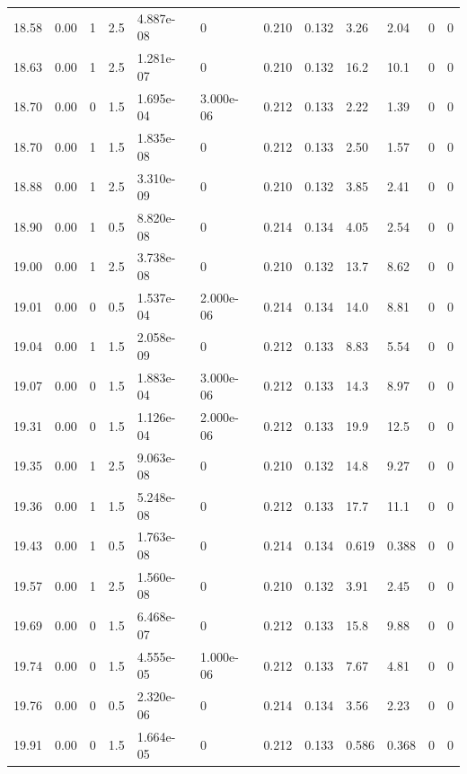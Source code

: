 \documentclass[preview]{standalone}
\begin{document}
{{{{{{{\begin{tabular}{L{1.2cm}C{1.2cm} C{0.3cm}C{0.5cm} C{1.4cm}C{1.4cm} C{1.4cm}C{1.4cm} C{1.6cm}C{1.6cm} C{1.6cm}C{1.6cm}}
  18.58  &  0.00  & 1     & 2.5 &  4.887e-08  & 0  &  0.210&   0.132& 3.26 & 2.04   &  0 & 0  \\ 
  18.63  &  0.00  & 1     & 2.5 &  1.281e-07  & 0  &  0.210&   0.132& 16.2 & 10.1   &  0 & 0  \\ 
  18.70  &  0.00  & 0     & 1.5 &  1.695e-04  & 3.000e-06  &  0.212&   0.133& 2.22 & 1.39   &  0 & 0  \\ 
  18.70  &  0.00  & 1     & 1.5 &  1.835e-08  & 0  &  0.212&   0.133& 2.50 & 1.57   &  0 & 0  \\ 
  18.88  &  0.00  & 1     & 2.5 &  3.310e-09  & 0  &  0.210&   0.132& 3.85 & 2.41   &  0 & 0  \\ 
  18.90  &  0.00  & 1     & 0.5 &  8.820e-08  & 0  &  0.214&   0.134& 4.05 & 2.54   &  0 & 0  \\ 
  19.00  &  0.00  & 1     & 2.5 &  3.738e-08  & 0  &  0.210&   0.132& 13.7 & 8.62   &  0 & 0  \\ 
  19.01  &  0.00  & 0     & 0.5 &  1.537e-04  & 2.000e-06  &  0.214&   0.134& 14.0 & 8.81   &  0 & 0  \\ 
  19.04  &  0.00  & 1     & 1.5 &  2.058e-09  & 0  &  0.212&   0.133& 8.83 & 5.54   &  0 & 0  \\ 
  19.07  &  0.00  & 0     & 1.5 &  1.883e-04  & 3.000e-06  &  0.212&   0.133& 14.3 & 8.97   &  0 & 0  \\ 
  19.31  &  0.00  & 0     & 1.5 &  1.126e-04  & 2.000e-06  &  0.212&   0.133& 19.9 & 12.5   &  0 & 0  \\ 
  19.35  &  0.00  & 1     & 2.5 &  9.063e-08  & 0  &  0.210&   0.132& 14.8 & 9.27   &  0 & 0  \\ 
  19.36  &  0.00  & 1     & 1.5 &  5.248e-08  & 0  &  0.212&   0.133& 17.7 & 11.1   &  0 & 0  \\ 
  19.43  &  0.00  & 1     & 0.5 &  1.763e-08  & 0  &  0.214&   0.134& 0.619 & 0.388   &  0 & 0  \\ 
  19.57  &  0.00  & 1     & 2.5 &  1.560e-08  & 0  &  0.210&   0.132& 3.91 & 2.45   &  0 & 0  \\ 
  19.69  &  0.00  & 0     & 1.5 &  6.468e-07  & 0  &  0.212&   0.133& 15.8 & 9.88   &  0 & 0  \\ 
  19.74  &  0.00  & 0     & 1.5 &  4.555e-05  & 1.000e-06  &  0.212&   0.133& 7.67 & 4.81   &  0 & 0  \\ 
  19.76  &  0.00  & 0     & 0.5 &  2.320e-06  & 0  &  0.214&   0.134& 3.56 & 2.23   &  0 & 0  \\ 
  19.91  &  0.00  & 0     & 1.5 &  1.664e-05  & 0  &  0.212&   0.133& 0.586 & 0.368   &  0 & 0  \\ 

\end{tabular}}}}}}}}
\end{document}
